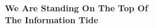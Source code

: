 \documentclass[a4paper,11pt]{article}
\begin{document}
%
\newpage                                                          %
\begin{center}
{\huge \textbf{We Are Standing On The Top Of \\The Information Tide}}

\end{center}
\begin{center}
	{\huge \textbf{ }}
	
\end{center}
\tableofcontents   
\pagestyle{fancy}                            
\newpage
\pagestyle{fancy}                                                     

\end{document}

